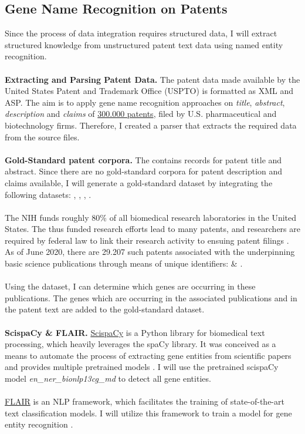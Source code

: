 \documentclass{article}
\begin{document}
\subsection{Gene Name Recognition on Patents}
Since the process of data integration requires structured data, I will extract structured knowledge from unstructured patent text data using named entity recognition. \\
\\
\textbf{Extracting and Parsing Patent Data.} The patent data made available by the United States Patent and Trademark Office (USPTO) is formatted as XML and ASP. The aim is to apply gene name recognition approaches on \textit{title}, \textit{abstract}, \textit{description} and \textit{claims} of \href{http://patft.uspto.gov/netahtml/PTO/index.html}{300.000 patents}, filed by U.S. pharmaceutical and biotechnology firms. Therefore, I created a parser that extracts the required data from the source files. \\
\\
\textbf{Gold-Standard patent corpora.} The  contains records for patent title and abstract. Since there are no gold-standard corpora for patent description and claims available, I will generate a gold-standard dataset by integrating the following datasets: , , , . \\
\\
The NIH funds roughly 80\% of all biomedical research laboratories in the United States. The thus funded research efforts lead to many patents, and researchers are required by federal law to link their research activity to ensuing patent filings \cite{Li2017TheAV}. As of June 2020, there are 29.207 such patents associated with the underpinning basic science publications through means of unique identifiers:  \& . \\
\\
Using the  dataset, I can determine which genes are occurring in these publications. The genes which are occurring in the associated publications and in the patent text are added to the gold-standard dataset.
\\
\\
\textbf{ScispaCy \& FLAIR.} \href{https://allenai.github.io/scispacy/}{ScispaCy} is a Python library for biomedical text processing, which heavily leverages the spaCy library. It was conceived as a means to automate the process of extracting gene entities from scientific papers and provides multiple pretrained models \cite{Neumann2019ScispaCyFA}. I will use the pretrained scispaCy model \textit{en\_ner\_bionlp13cg\_md} to detect all gene entities. \\
\\
\href{https://www.informatik.hu-berlin.de/de/forschung/gebiete/ml/Flair/flair}{FLAIR} is an NLP framework, which facilitates the training of state-of-the-art text classification models. I will utilize this framework to train a model for gene entity recognition \cite{Akbik2019FLAIRAE}. 
\end{document}
